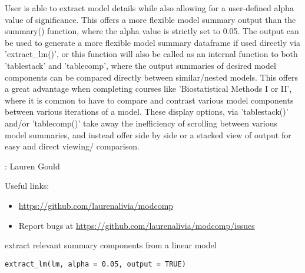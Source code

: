\documentclass[a4paper]{book}
\begin{document}
%
\begin{Description}
User is able to extract model details while also allowing for a user-defined alpha value of significance. This offers a more flexible model summary output than the summary() function, where the alpha value is strictly set to 0.05. The output can be used to generate a more flexible model summary dataframe if used directly via 'extract\_lm()', or this function will also be called as an internal function to both 'tablestack' and 'tablecomp', where the output summaries of desired model components can be compared directly between similar/nested models. This offers a great advantage when completing courses like 'Biostatistical Methods I or II', where it is common to have to compare and contrast various model components between various iterations of a model. These display options, via 'tablestack()' and/or 'tablecomp()' take away the inefficiency of scrolling between various model summaries, and instead offer side by side or a stacked view of output for easy and direct viewing/ comparison.
\end{Description}
%
\begin{Author}
: Lauren Gould 

\end{Author}
%
\begin{SeeAlso}
Useful links:
\begin{itemize}

\item{} \url{https://github.com/laurenalivia/modcomp}
\item{} Report bugs at \url{https://github.com/laurenalivia/modcomp/issues}

\end{itemize}


\end{SeeAlso}
%
\begin{Description}
extract relevant summary components from a linear model
\end{Description}
%
\begin{Usage}
\begin{verbatim}
extract_lm(lm, alpha = 0.05, output = TRUE)
\end{verbatim}
\end{Usage}
\end{document}
